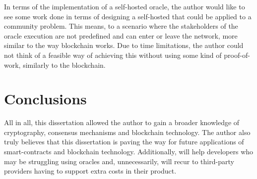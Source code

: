 In terms of the implementation of a self-hosted oracle, the author would like to see some work done in terms of designing a self-hosted that could be applied to a community problem. This means, to a scenario where the stakeholders of the oracle execution are not predefined and can enter or leave the network, more similar to the way blockchain works. Due to time limitations, the author could not think of a feasible way of achieving this without using some kind of proof-of-work, similarly to the blockchain.

\section{Conclusions}

All in all, this dissertation allowed the author to gain a broader knowledge of cryptography, consensus mechanisms and blockchain technology. The author also truly believes that this dissertation is paving the way for future applications of smart-contracts and blockchain technology. Additionally, will help developers who may be struggling using oracles and, unnecessarily, will recur to third-party providers having to support extra costs in their product.